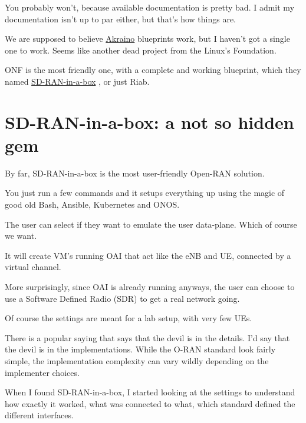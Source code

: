 \documentclass{article}
\begin{document}
        You probably won't, because available documentation is pretty bad.
        I admit my documentation isn't up to par either, but that's how things are.

        We are supposed to believe \href{https://wiki.akraino.org/}{Akraino}
        blueprints work, but I haven't got a single one to work.
        Seems like another dead project from the Linux's Foundation.

        ONF is the most friendly one, with a complete and working blueprint,
        which they named
        \href{https://docs.sd-ran.org/master/sdran-in-a-box/README.html}{SD-RAN-in-a-box}
        , or just Riab.

\section{SD-RAN-in-a-box: a not so hidden gem}
    By far, SD-RAN-in-a-box is the most user-friendly Open-RAN solution.

    You just run a few commands and it setups everything up using the magic of
    good old Bash, Ansible, Kubernetes and ONOS.

    The user can select if they want to emulate the user data-plane. Which of course we want.

    It will create VM's running OAI that act like the eNB and UE, connected by a virtual channel.

    More surprisingly, since OAI is already running anyways, the user can choose to use a
    Software Defined Radio (SDR) to get a real network going.

    Of course the settings are meant for a lab setup, with very few UEs.

    There is a popular saying that says that the devil is in the details.
    I'd say that the devil is in the implementations.
    While the O-RAN standard look fairly simple, the implementation complexity
    can vary wildly depending on the implementer choices.

    When I found SD-RAN-in-a-box, I started looking at the settings to understand how
    exactly it worked, what was connected to what, which standard defined the different interfaces.
\end{document}
